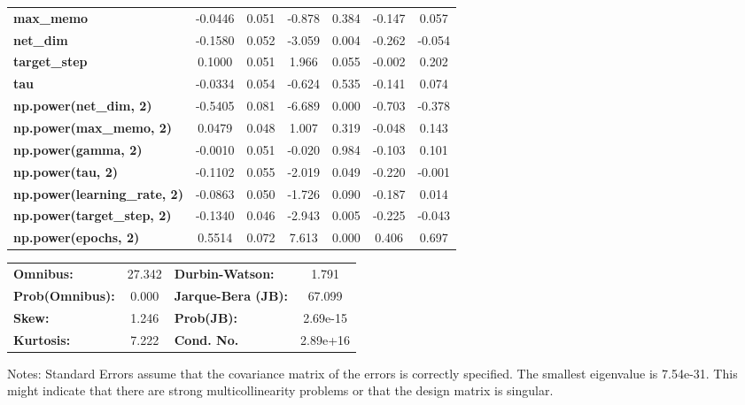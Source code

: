 \begin{center}
\begin{tabular}{lcccccc}
\textbf{max\_memo}                   &      -0.0446  &        0.051     &    -0.878  &         0.384        &       -0.147    &        0.057     \\
\textbf{net\_dim}                    &      -0.1580  &        0.052     &    -3.059  &         0.004        &       -0.262    &       -0.054     \\
\textbf{target\_step}                &       0.1000  &        0.051     &     1.966  &         0.055        &       -0.002    &        0.202     \\
\textbf{tau}                         &      -0.0334  &        0.054     &    -0.624  &         0.535        &       -0.141    &        0.074     \\
\textbf{np.power(net\_dim, 2)}       &      -0.5405  &        0.081     &    -6.689  &         0.000        &       -0.703    &       -0.378     \\
\textbf{np.power(max\_memo, 2)}      &       0.0479  &        0.048     &     1.007  &         0.319        &       -0.048    &        0.143     \\
\textbf{np.power(gamma, 2)}          &      -0.0010  &        0.051     &    -0.020  &         0.984        &       -0.103    &        0.101     \\
\textbf{np.power(tau, 2)}            &      -0.1102  &        0.055     &    -2.019  &         0.049        &       -0.220    &       -0.001     \\
\textbf{np.power(learning\_rate, 2)} &      -0.0863  &        0.050     &    -1.726  &         0.090        &       -0.187    &        0.014     \\
\textbf{np.power(target\_step, 2)}   &      -0.1340  &        0.046     &    -2.943  &         0.005        &       -0.225    &       -0.043     \\
\textbf{np.power(epochs, 2)}         &       0.5514  &        0.072     &     7.613  &         0.000        &        0.406    &        0.697     \\
\bottomrule
\end{tabular}
\begin{tabular}{lclc}
\textbf{Omnibus:}       & 27.342 & \textbf{  Durbin-Watson:     } &    1.791  \\
\textbf{Prob(Omnibus):} &  0.000 & \textbf{  Jarque-Bera (JB):  } &   67.099  \\
\textbf{Skew:}          &  1.246 & \textbf{  Prob(JB):          } & 2.69e-15  \\
\textbf{Kurtosis:}      &  7.222 & \textbf{  Cond. No.          } & 2.89e+16  \\
\bottomrule
\end{tabular}
\end{center}

Notes: \newline
 [1] Standard Errors assume that the covariance matrix of the errors is correctly specified. \newline
 [2] The smallest eigenvalue is 7.54e-31. This might indicate that there are \newline
 strong multicollinearity problems or that the design matrix is singular.